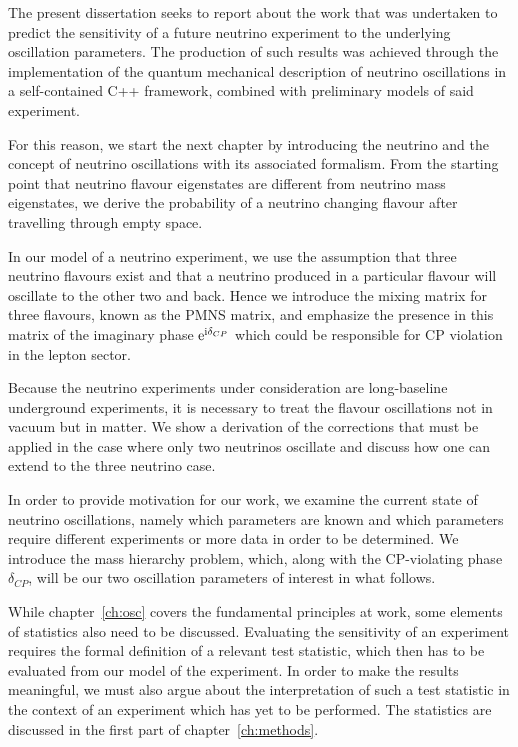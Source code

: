 \label{ch:introduction}
The present dissertation seeks to report about the work that was undertaken to
predict the sensitivity of a future neutrino experiment to the underlying
oscillation parameters. 
The production of such results was achieved through the implementation of the
quantum mechanical description of neutrino oscillations in a self-contained C++
framework, combined with preliminary models of said experiment.

For this reason, we start the next chapter by introducing the neutrino and the
concept of neutrino oscillations with its associated formalism. From the
starting point that neutrino flavour eigenstates are different from neutrino
mass eigenstates, we derive the probability of a neutrino changing flavour
after travelling through empty space. 

In our model of a neutrino experiment, we use the assumption that three
neutrino flavours exist and that a neutrino produced in a particular flavour
will oscillate to the other two and back. Hence we introduce the mixing matrix
for three flavours, known as the PMNS matrix, and emphasize the presence in this
matrix of the imaginary phase $\mathrm{e}^{\mathrm{i}\delta_{CP}}$ which could be responsible for CP
violation in the lepton sector. 

Because the neutrino experiments under consideration are long-baseline
underground experiments, it is necessary to treat the flavour oscillations not
in vacuum but in matter. We show a derivation of the corrections that must be
applied in the case where only two neutrinos oscillate and discuss how one can
extend to the three neutrino case.

In order to provide motivation for our work, we examine the current state of
neutrino oscillations, namely which parameters are known and which parameters
require different experiments or more data in order to be determined. We
introduce the mass hierarchy problem, which, along with the CP-violating phase
$\delta_{CP}$, will be our two oscillation parameters of interest in what
follows.


While chapter~\ref{ch:osc} covers the fundamental principles at work, some elements of
statistics also need to be discussed. Evaluating the sensitivity of an
experiment requires the formal definition of a relevant test statistic, which
then has to be evaluated from our model of the experiment. In order to make the
results meaningful, we must also argue about the interpretation of such a test
statistic in the context of an experiment which has yet to be performed.
The statistics are discussed in the first part of chapter~\ref{ch:methods}.

